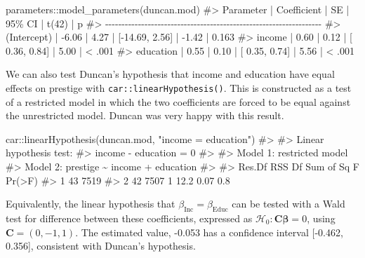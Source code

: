\documentclass[
  letterpaper,
  10pt,
  krantz2]{krantz}
\makeatletter
\newenvironment{Shaded}{\begin{snugshade}}{\end{snugshade}}
\newcommand{\CommentTok}[1]{\textcolor[rgb]{0.37,0.37,0.37}{#1}}
\newcommand{\FunctionTok}[1]{\textcolor[rgb]{0.28,0.35,0.67}{#1}}
\newcommand{\NormalTok}[1]{\textcolor[rgb]{0.00,0.23,0.31}{#1}}
\newcommand{\SpecialCharTok}[1]{\textcolor[rgb]{0.37,0.37,0.37}{#1}}
\newcommand{\StringTok}[1]{\textcolor[rgb]{0.13,0.47,0.30}{#1}}
\newenvironment{kframe}{%
  \medskip{}
  \setlength{\fboxsep}{.8em}
  \def\at@end@of@kframe{}%
  \ifinner\ifhmode%
  \def\at@end@of@kframe{\end{minipage}}%
  \begin{minipage}{\columnwidth}%
  \fi\fi%
  \def\FrameCommand##1{\hskip\@totalleftmargin \hskip-\fboxsep
  \colorbox{shadecolor}{##1}\hskip-\fboxsep
      \hskip-\linewidth \hskip-\@totalleftmargin \hskip\columnwidth}%
  \MakeFramed {\advance\hsize-\width
    \@totalleftmargin\z@ \linewidth\hsize
    \@setminipage}}%
{\par\unskip\endMakeFramed%
  \at@end@of@kframe}
\renewenvironment{Shaded}{\begin{kframe}}{\end{kframe}}
\makeatother
\begin{document}
\begin{Shaded}
\begin{Highlighting}[]
\NormalTok{parameters}\SpecialCharTok{::}\FunctionTok{model\_parameters}\NormalTok{(duncan.mod)}
\CommentTok{\#\textgreater{} Parameter   | Coefficient |   SE |         95\% CI | t(42) |      p}
\CommentTok{\#\textgreater{} {-}{-}{-}{-}{-}{-}{-}{-}{-}{-}{-}{-}{-}{-}{-}{-}{-}{-}{-}{-}{-}{-}{-}{-}{-}{-}{-}{-}{-}{-}{-}{-}{-}{-}{-}{-}{-}{-}{-}{-}{-}{-}{-}{-}{-}{-}{-}{-}{-}{-}{-}{-}{-}{-}{-}{-}{-}{-}{-}{-}{-}{-}{-}{-}{-}{-}}
\CommentTok{\#\textgreater{} (Intercept) |       {-}6.06 | 4.27 | [{-}14.69, 2.56] | {-}1.42 | 0.163 }
\CommentTok{\#\textgreater{} income      |        0.60 | 0.12 | [  0.36, 0.84] |  5.00 | \textless{} .001}
\CommentTok{\#\textgreater{} education   |        0.55 | 0.10 | [  0.35, 0.74] |  5.56 | \textless{} .001}
\end{Highlighting}
\end{Shaded}

We can also test Duncan's hypothesis that income and education have
equal effects on prestige with \texttt{car::linearHypothesis()}. This is
constructed as a test of a restricted model in which the two
coefficients are forced to be equal against the unrestricted model.
Duncan was very happy with this result.

\begin{Shaded}
\begin{Highlighting}[]
\NormalTok{car}\SpecialCharTok{::}\FunctionTok{linearHypothesis}\NormalTok{(duncan.mod, }\StringTok{"income = education"}\NormalTok{)}
\CommentTok{\#\textgreater{} }
\CommentTok{\#\textgreater{} Linear hypothesis test:}
\CommentTok{\#\textgreater{} income {-} education = 0}
\CommentTok{\#\textgreater{} }
\CommentTok{\#\textgreater{} Model 1: restricted model}
\CommentTok{\#\textgreater{} Model 2: prestige \textasciitilde{} income + education}
\CommentTok{\#\textgreater{} }
\CommentTok{\#\textgreater{}   Res.Df  RSS Df Sum of Sq    F Pr(\textgreater{}F)}
\CommentTok{\#\textgreater{} 1     43 7519                         }
\CommentTok{\#\textgreater{} 2     42 7507  1      12.2 0.07    0.8}
\end{Highlighting}
\end{Shaded}

Equivalently, the linear hypothesis that
\(\beta_{\text{Inc}} = \beta_{\text{Educ}}\) can be tested with a Wald
test for difference between these coefficients, expressed as
\(\mathcal{H}_0 : \mathbf{C} \mathbf{\beta} = 0\), using
\(\mathbf{C} = (0, -1, 1)\). The estimated value, -0.053 has a
confidence interval {[}-0.462, 0.356{]}, consistent with Duncan's
hypothesis.
\end{document}
